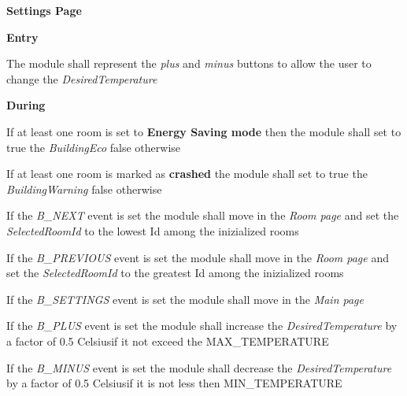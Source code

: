 \begin{req_enum}
\begin{req_enum}[label*=\arabic*.]
					\item \textbf{Settings Page}
						\begin{req_enum}[label*=\arabic*.]
							\item \textbf{Entry}
							\begin{req_enum}[label*=\arabic*.]
								\item The module shall represent the \textit{plus} and \textit{minus} buttons to allow the user to change the \textit{DesiredTemperature} \\
							\end{req_enum}	
							\item \textbf{During}
							\begin{req_enum}[label*=\arabic*.]
								\item If at least one room is set to \textbf{Energy Saving mode} then the module shall set to true the \textit{BuildingEco} false otherwise \\
								\item If at least one room is marked as \textbf{crashed} the module shall set to true the \textit{BuildingWarning} false otherwise \\

								\item If the \textit{B\_NEXT} event is set the module shall move in the \textit{Room page} and set the \textit{SelectedRoomId} to the lowest Id among the inizialized rooms \\
								\item If the \textit{B\_PREVIOUS} event is set the module shall move in the \textit{Room page} and set the \textit{SelectedRoomId} to the greatest Id among the inizialized rooms \\
								\item If the \textit{B\_SETTINGS} event is set the module shall move in the \textit{Main page}
								\item If the \textit{B\_PLUS} event is set the module shall increase the \textit{DesiredTemperature} by a factor of 0.5 Celsius\degree if it not exceed the MAX\_TEMPERATURE
								\item If the \textit{B\_MINUS} event is set the module shall decrease the \textit{DesiredTemperature} by a factor of 0.5 Celsius\degree if it is not less then MIN\_TEMPERATURE


\end{req_enum}
\end{req_enum}
\end{req_enum}
\end{req_enum}
